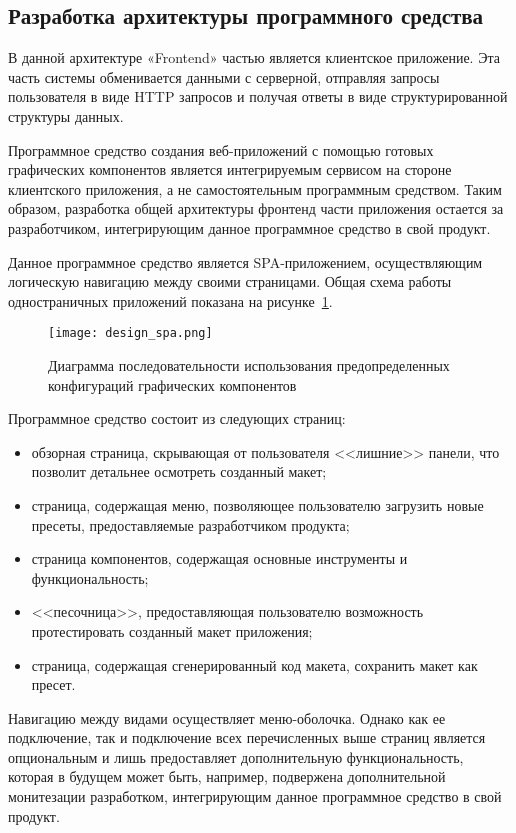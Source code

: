 \subsection{Разработка архитектуры программного средства}
\label{sec:modeling:sequence_diagram}

В данной архитектуре «Frontend» частью является клиентское приложение. Эта часть системы обменивается данными с серверной, отправляя запросы пользователя в виде HTTP запросов и получая ответы в виде структурированной структуры данных. 

Программное средство создания веб-приложений с помощью готовых графических компонентов является интегрируемым сервисом на стороне клиентского приложения, а не самостоятельным программным средством. Таким образом, разработка общей архитектуры фронтенд части приложения остается за разработчиком, интегрирующим данное программное средство в свой продукт.

Данное программное средство является SPA-приложением, осуществляющим логическую навигацию между своими страницами. Общая схема работы одностраничных приложений показана на рисунке~\ref{sec:design:spa}.\pagebreak
\begin{figure}[ht]
\centering
    \texttt{[image: design\_spa.png]}
    \caption{Диаграмма последовательности использования предопределенных конфигураций графических компонентов}
    \label{sec:design:spa}
\end{figure}

Программное средство состоит из следующих страниц:

\begin{itemize}
    \item обзорная страница, скрывающая от пользователя <<лишние>> панели, что позволит детальнее осмотреть созданный макет;
    \item страница, содержащая меню, позволяющее пользователю загрузить новые пресеты, предоставляемые разработчиком продукта;
    \item страница компонентов, содержащая основные инструменты и функциональность;
    \item <<песочница>>, предоставляющая пользователю возможность протестировать созданный макет приложения;
    \item страница, содержащая сгенерированный код макета, сохранить макет как пресет.
\end{itemize}

Навигацию между видами осуществляет меню-оболочка. Однако как ее подключение, так и подключение всех перечисленных выше страниц является опциональным и лишь предоставляет дополнительную функциональность, которая в будущем может быть, например, подвержена дополнительной монитезации разработком, интегрирующим данное программное средство в свой продукт.

